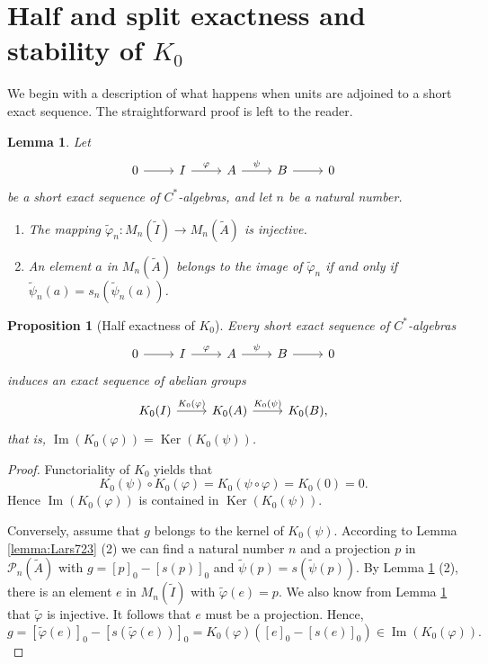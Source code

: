 \documentclass{book}
\newtheorem{lemma}[definition]{Lemma}
\newtheorem{proposition}[definition]{Proposition}
\def\cstars{\(C^*\)-algebras}
\begin{document}
\section{Half and split exactness and stability of \texorpdfstring{\(K_0\)}{K0}}
We begin with a description of what happens when units are adjoined to a short exact sequence.
The straightforward proof is left to the reader.
\begin{lemma}\label{lemma:Lars431}
  Let
  \[
    \begin{tikzcd}
      0\arrow[r]&I\arrow[r,"\varphi"]&A\arrow[r,"\psi"]&B\arrow[r]&0
    \end{tikzcd}
  \]
  be a short exact sequence of \cstars, and let \(n\) be a natural number.
  \begin{enumerate}
    \item The mapping \(\tilde{\varphi}_n:M_n(\tilde{I})\to M_n(\tilde{A})\) is injective.
    \item An element \(a\) in \(M_n(\tilde{A})\) belongs to the image of \(\tilde{\varphi}_n\) if and only if \(\tilde{\psi}_n(a)=s_n(\tilde{\psi}_n(a))\).
  \end{enumerate}
\end{lemma}
\begin{proposition}[Half exactness of \(K_0\)]\label{prop:Lars432}
  Every short exact sequence of \cstars
  \[
    \begin{tikzcd}
      0\arrow[r]&I\arrow[r,"\varphi"]&A\arrow[r,"\psi"]&B\arrow[r]&0
    \end{tikzcd}
  \]
  induces an exact sequence of abelian groups
  \[
    \begin{tikzcd}
      K_0(I)\arrow[r,"K_0(\varphi)"]&K_0(A)\arrow[r,"K_0(\psi)"]&K_0(B),
    \end{tikzcd}
  \]
  that is, \(\operatorname{Im}(K_0(\varphi))=\operatorname{Ker}(K_0(\psi))\).
\end{proposition}
\begin{proof}
  Functoriality of \(K_0\) yields that
  \[
    K_0(\psi)\circ K_0(\varphi)=K_0(\psi\circ\varphi)=K_0(0)=0.
  \]
  Hence \(\operatorname{Im}(K_0(\varphi))\) is contained in \(\operatorname{Ker}(K_0(\psi))\).\par
  Conversely, assume that \(g\) belongs to the kernel of \(K_0(\psi)\). According to Lemma \ref{lemma:Lars723} (2) we can
  find a natural number \(n\) and a projection \(p\) in \(\mathcal{P}_n(\tilde{A})\) with
  \(g={[p]}_0-{[s(p)]}_0\) and \(\tilde{\psi}(p)=s(\tilde{\psi}(p))\). By Lemma \ref{lemma:Lars431} (2), there is 
  an element \(e\) in \(M_n(\tilde{I})\) with \(\tilde{\varphi}(e)=p\). We also know from Lemma \ref{lemma:Lars431} that \(\tilde{\varphi}\)
  is injective. It follows that \(e\) must be a projection. Hence,
  \[
    g={[\tilde{\varphi}(e)]}_0-{[s(\tilde{\varphi}(e))]}_0=K_0(\varphi)({[e]}_0-{[s(e)]}_0)\in \operatorname{Im}(K_0(\varphi)).
  \]
\end{proof}
\end{document}
